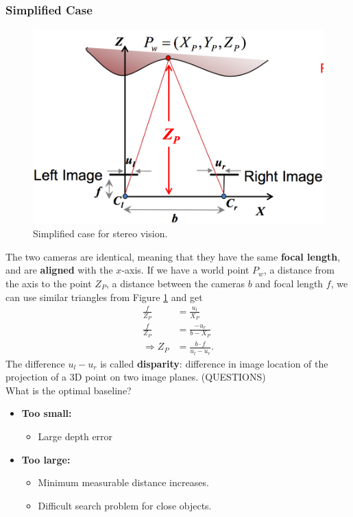 \documentclass[a4paper,12 pt]{article}
\theoremstyle{definition}
\theoremstyle{remark}
\theoremstyle{definition}
\theoremstyle{definition}
\theoremstyle{definition}
\theoremstyle{remark}
\theoremstyle{definition}
\begin{document}
\subsubsection*{Simplified Case}
\begin{figure}[tbh]
\begin{center}
\includegraphics[scale=0.3]{pics/stereo_vis}
\caption{Simplified case for stereo vision. \label{fig:stereo_vis}}
\end{center}
\end{figure}
The two cameras are identical, meaning that they have the same \textbf{focal length}, and are \textbf{aligned} with the $x$-axis. If we have a world point $P_w$, a distance from the axis to the point $Z_P$, a distance between the cameras $b$ and focal length $f$, we can use similar triangles from Figure \ref{fig:stereo_vis} and get
\begin{equation}
\begin{split}
\frac{f}{Z_P}&=\frac{u_l}{X_P}\\
\frac{f}{Z_P}&=\frac{-u_r}{b-X_P}\\
\Rightarrow Z_P&=\frac{b\cdot f}{u_l-u_r}.
\end{split}
\end{equation}
The difference $u_l-u_r$ is called \textbf{disparity}: difference in image location of the projection of a 3D point on two image planes. (QUESTIONS)\\
What is the optimal baseline?
\begin{itemize}
\item \textbf{Too small:}
\begin{itemize}
\item Large depth error
\end{itemize}
\item \textbf{Too large:}
\begin{itemize}
\item Minimum measurable distance increases.
\item Difficult search problem for close objects.
\end{itemize}
\end{itemize}
\end{document}

